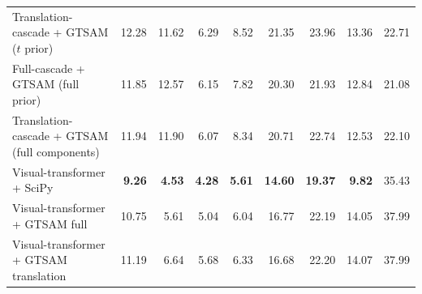 \documentclass[11pt]{article}
\newcommand{\best}[1]{\textbf{#1}}
\begin{document}
\begin{landscape}
\begin{table}[H]
{\begin{tabular}{lrrrrrrrr}
Translation-cascade + GTSAM ($t$ prior) & 12.28 & 11.62 & 6.29 & 8.52 & 21.35 & 23.96 & 13.36 & 22.71\\
Full-cascade + GTSAM (full prior) & 11.85 & 12.57 & 6.15 & 7.82 & 20.30 & 21.93 & 12.84 & 21.08\\
Translation-cascade + GTSAM (full components) & 11.94 & 11.90 & 6.07 & 8.34 & 20.71 & 22.74 & 12.53 & 22.10\\
Visual-transformer + SciPy & \best{9.26} & \best{4.53} & \best{4.28} & \best{5.61} & \best{14.60} & \best{19.37} & \best{9.82} & 35.43\\
Visual-transformer + GTSAM full & 10.75 & 5.61 & 5.04 & 6.04 & 16.77 & 22.19 & 14.05 & 37.99\\
Visual-transformer + GTSAM translation & 11.19 & 6.64 & 5.68 & 6.33 & 16.68 & 22.20 & 14.07 & 37.99\\
\bottomrule
\end{tabular}}
\end{table}
\end{landscape}
\end{document}
